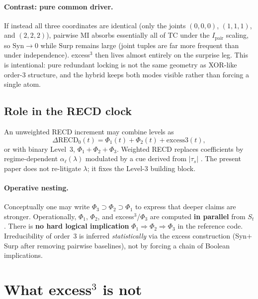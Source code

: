\documentclass[11pt,a4paper]{article}
\begin{document}
\paragraph{Contrast: pure common driver.}
If instead all three coordinates are identical
(only the joints $(0,0,0)$, $(1,1,1)$, and $(2,2,2)$), pairwise MI
absorbs essentially all of TC under the $I_{\mathrm{pair}}$ scaling, so
$\mathrm{Syn}\to 0$ while $\mathrm{Surp}$ remains large (joint tuples are far
more frequent than under independence). excess$^3$ then lives almost entirely
on the surprise leg. This is intentional: pure redundant locking is not the
same geometry as XOR-like order-3 structure, and the hybrid keeps both modes
visible rather than forcing a single atom.

\subsection{Role in the RECD clock}
\label{sec:recd}

An unweighted RECD increment may combine levels as
\begin{equation}
\label{eq:drecd}
\Delta\mathrm{RECD}_0(t)
=\Phi_1(t)+\Phi_2(t)+\mathrm{excess3}(t),
\end{equation}
or with binary Level~3, $\Phi_1+\Phi_2+\Phi_3$. Weighted RECD replaces
coefficients by regime-dependent $\alpha_\ell(\lambda)$ modulated by a cue
derived from $|\tau_s|$ \citep{Padilla2026framework}. The present paper does
not re-litigate $\lambda$; it fixes the Level-3 building block.

\paragraph{Operative nesting.}
Conceptually one may write $\Phi_3\supset\Phi_2\supset\Phi_1$ to express that
deeper claims are stronger. Operationally, $\Phi_1$, $\Phi_2$, and
excess$^3$/$\Phi_3$ are computed \textbf{in parallel} from $S_t$. There is
\textbf{no hard logical implication}
$\Phi_1\Rightarrow\Phi_2\Rightarrow\Phi_3$ in the reference code.
Irreducibility of order~3 is inferred \emph{statistically} via the excess
construction (Syn$+$Surp after removing pairwise baselines), not by
forcing a chain of Boolean implications.

\section{What excess$^3$ is not}
\label{sec:boundaries}
\end{document}
